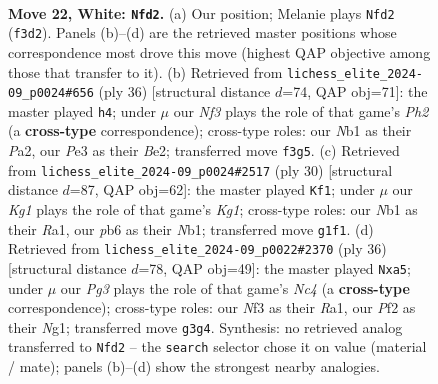 \documentclass[11pt]{article}
\begin{document}
\clearpage

\begin{figure}[p]\centering
\begin{subfigure}{0.46\textwidth}\centering
\resizebox{\linewidth}{!}{%
\newchessgame
\chessboard[
  setfen={rqb1k2r/p3b1pp/1p6/n2p1p1n/Pp1P3P/4PNPB/RBQ2P2/1N2R1K1 w - - 7 22},
  showmover=false,
  pgfstyle=straightmove, color=movearrow, markmove={f3-d2}
]}
\caption{}
\end{subfigure}\hfill
\begin{subfigure}{0.46\textwidth}\centering
\resizebox{\linewidth}{!}{%
\newchessgame
\chessboard[
  setfen={r1b1r1k1/ppn2p2/3p1q1p/2pP1Pp1/4P3/2N3R1/PP1QB1PP/R6K w - - 0 19},
  showmover=false,
  pgfstyle=straightmove, color=movearrow, markmove={h2-h4}
]}
\caption{}
\end{subfigure}
\\[4pt]
\begin{subfigure}{0.46\textwidth}\centering
\resizebox{\linewidth}{!}{%
\newchessgame
\chessboard[
  setfen={r1b1kb1r/pp6/2n1pp1q/2PpP1p1/1P4P1/2PQ1N2/P4PP1/RNB1R1K1 w kq - 4 16},
  showmover=false,
  pgfstyle=straightmove, color=movearrow, markmove={g1-f1}
]}
\caption{}
\end{subfigure}\hfill
\begin{subfigure}{0.46\textwidth}\centering
\resizebox{\linewidth}{!}{%
\newchessgame
\chessboard[
  setfen={r4k1r/bpqb1ppp/p3p3/n2nP2P/2Np1PP1/P2B1Q2/1PP2B2/R2K2NR w - - 13 19},
  showmover=false,
  pgfstyle=straightmove, color=movearrow, markmove={c4-a5}
]}
\caption{}
\end{subfigure}
\caption{\textbf{Move 22, White: \texttt{Nfd2}.} (a) Our position; Melanie plays \texttt{Nfd2} (\texttt{f3d2}). Panels (b)--(d) are the retrieved master positions whose correspondence most drove this move (highest QAP objective among those that transfer to it). (b) Retrieved from \texttt{lichess\_elite\_2024-09\_p0024\#656} (ply 36) [structural distance $d$=74, QAP obj=71]: the master played \texttt{h4}; under $\mu$ our \emph{Nf3} plays the role of that game's \emph{Ph2} (a \textbf{cross-type} correspondence); cross-type roles: our \emph{N}b1 as their \emph{P}a2, our \emph{P}e3 as their \emph{B}e2; transferred move \texttt{f3g5}. (c) Retrieved from \texttt{lichess\_elite\_2024-09\_p0024\#2517} (ply 30) [structural distance $d$=87, QAP obj=62]: the master played \texttt{Kf1}; under $\mu$ our \emph{Kg1} plays the role of that game's \emph{Kg1}; cross-type roles: our \emph{N}b1 as their \emph{R}a1, our \emph{p}b6 as their \emph{N}b1; transferred move \texttt{g1f1}. (d) Retrieved from \texttt{lichess\_elite\_2024-09\_p0022\#2370} (ply 36) [structural distance $d$=78, QAP obj=49]: the master played \texttt{Nxa5}; under $\mu$ our \emph{Pg3} plays the role of that game's \emph{Nc4} (a \textbf{cross-type} correspondence); cross-type roles: our \emph{N}f3 as their \emph{R}a1, our \emph{P}f2 as their \emph{N}g1; transferred move \texttt{g3g4}. Synthesis: no retrieved analog transferred to \texttt{Nfd2} -- the \texttt{search} selector chose it on value (material / mate); panels (b)--(d) show the strongest nearby analogies.}
\label{fig:thought-m42}
\end{figure}
\end{document}
